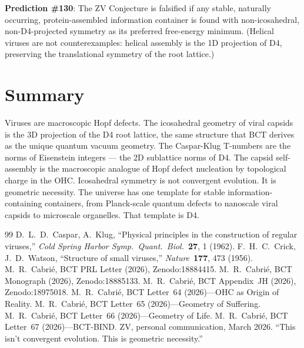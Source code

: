 \documentclass[aps,prl,preprint,superscriptaddress,floatfix]{revtex4-2}
\begin{document}
\textbf{Prediction \#130}: The ZV Conjecture is falsified if any
stable, naturally occurring, protein-assembled information container
is found with non-icosahedral, non-D4-projected symmetry as its
preferred free-energy minimum. (Helical viruses are not
counterexamples: helical assembly is the 1D projection of D4,
preserving the translational symmetry of the root lattice.)

\section{Summary}

Viruses are macroscopic Hopf defects. The icosahedral geometry of
viral capsids is the 3D projection of the D4 root lattice, the same
structure that BCT derives as the unique quantum vacuum geometry.
The Caspar-Klug T-numbers are the norms of Eisenstein integers ---
the 2D sublattice norms of D4. The capsid self-assembly is the
macroscopic analogue of Hopf defect nucleation by topological charge
in the OHC. Icosahedral symmetry is not convergent evolution. It is
geometric necessity. The universe has one template for stable
information-containing containers, from Planck-scale quantum defects
to nanoscale viral capsids to microscale organelles. That template
is D4.

\begin{thebibliography}{99}
 D.~L.~D.~Caspar, A.~Klug, ``Physical principles
  in the construction of regular viruses,''
  \textit{Cold Spring Harbor Symp.\ Quant.\ Biol.}\ \textbf{27},
  1 (1962).
 F.~H.~C.~Crick, J.~D.~Watson, ``Structure of
  small viruses,'' \textit{Nature}\ \textbf{177}, 473 (1956).
 M.~R.~Cabri\'e, BCT PRL Letter (2026), Zenodo:18884415.
 M.~R.~Cabri\'e, BCT Monograph (2026),
  Zenodo:18885133.
 M.~R.~Cabri\'e, BCT Appendix~JH (2026),
  Zenodo:18975018.
 M.~R.~Cabri\'e, BCT Letter~64 (2026)---OHC as
  Origin of Reality.
 M.~R.~Cabri\'e, BCT Letter~65 (2026)---Geometry
  of Suffering.
 M.~R.~Cabri\'e, BCT Letter~66 (2026)---Geometry
  of Life.
 M.~R.~Cabri\'e, BCT Letter~67 (2026)---BCT-BIND.
 ZV, personal communication, March 2026.
  ``This isn't convergent evolution. This is geometric necessity.''
\end{thebibliography}
\end{document}
